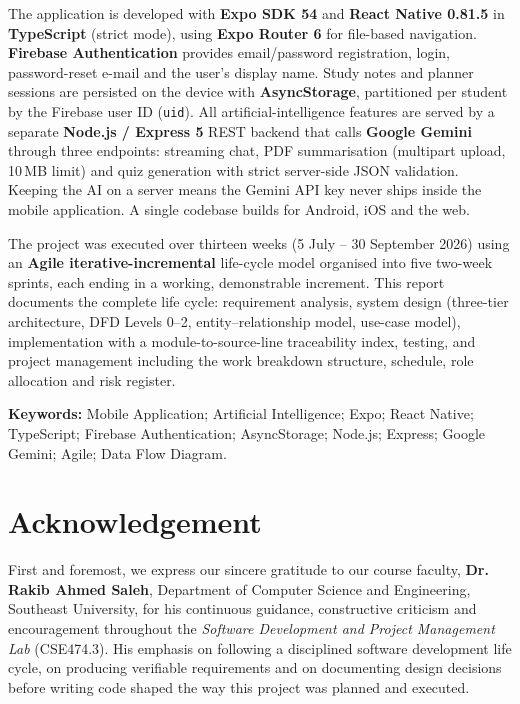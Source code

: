 \documentclass[12pt,a4paper,oneside]{report}
\begin{document}
The application is developed with \textbf{Expo SDK 54} and \textbf{React Native 0.81.5}
in \textbf{TypeScript} (strict mode), using \textbf{Expo Router 6} for file-based
navigation. \textbf{Firebase Authentication} provides email/password registration,
login, password-reset e-mail and the user's display name. Study notes and planner
sessions are persisted on the device with \textbf{AsyncStorage}, partitioned per
student by the Firebase user ID (\texttt{uid}). All artificial-intelligence features
are served by a separate \textbf{Node.js / Express 5} REST backend that calls
\textbf{Google Gemini} through three endpoints: streaming chat, PDF summarisation
(multipart upload, 10\,MB limit) and quiz generation with strict server-side JSON
validation. Keeping the AI on a server means the Gemini API key never ships inside
the mobile application. A single codebase builds for Android, iOS and the web.

The project was executed over thirteen weeks (5 July -- 30 September 2026) using an
\textbf{Agile iterative-incremental} life-cycle model organised into five two-week
sprints, each ending in a working, demonstrable increment. This report documents the
complete life cycle: requirement analysis, system design (three-tier architecture,
DFD Levels 0--2, entity--relationship model, use-case model), implementation with a
module-to-source-line traceability index, testing, and project management including
the work breakdown structure, schedule, role allocation and risk register.

\vspace{6pt}
\noindent\textbf{Keywords:} Mobile Application; Artificial Intelligence; Expo;
React Native; TypeScript; Firebase Authentication; AsyncStorage; Node.js; Express;
Google Gemini; Agile; Data Flow Diagram.

\chapter*{Acknowledgement}

First and foremost, we express our sincere gratitude to our course faculty,
\textbf{Dr. Rakib Ahmed Saleh}, Department of Computer Science and Engineering,
Southeast University, for his continuous guidance, constructive criticism and
encouragement throughout the \emph{Software Development and Project Management Lab}
(CSE474.3). His emphasis on following a disciplined software development life cycle,
on producing verifiable requirements and on documenting design decisions before
writing code shaped the way this project was planned and executed.
\end{document}
